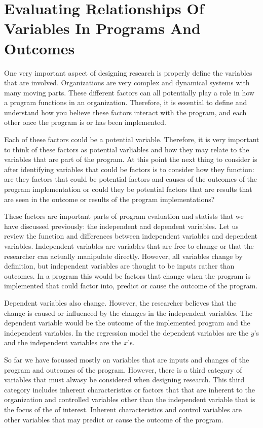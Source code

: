 \documentclass[]{book}
\theoremstyle{definition}
\theoremstyle{definition}
\theoremstyle{definition}
\theoremstyle{remark}
\begin{document}
\hypertarget{evaluating-relationships-of-variables-in-programs-and-outcomes}{%
\section{Evaluating Relationships Of Variables In Programs And
Outcomes}\label{evaluating-relationships-of-variables-in-programs-and-outcomes}}

One very important aspect of designing research is properly define the
variables that are involved. Organizations are very complex and
dynamical systems with many moving parts. These different factors can
all potentially play a role in how a program functions in an
organization. Therefore, it is essential to define and understand how
you believe these factors interact with the program, and each other once
the program is or has been implemented.

Each of these factors could be a potential variable. Therefore, it is
very important to think of these factors as potential varliables and how
they may relate to the variables that are part of the program. At this
point the next thing to consider is after identifying variables that
could be factors is to consider how they function: are they factors that
could be potential factors and causes of the outcomes of the program
implementation or could they be potential factors that are results that
are seen in the outcome or results of the program implementations?

These factors are important parts of program evaluation and statists
that we have discussed previously: the independent and dependent
variables. Let us review the function and differences between
independent variables and dependent variables. Independent variables are
variables that are free to change or that the researcher can actually
manipulate directly. However, all variables change by definition, but
independent variables are thought to be inputs rather than outcomes. In
a program this would be factors that change when the program is
implemented that could factor into, predict or cause the outcome of the
program.

Dependent variables also change. However, the researcher believes that
the change is caused or influenced by the changes in the independent
variables. The dependent variable would be the outcome of the
implemented program and the independent variables. In the regression
model the dependent variables are the \(y\)'s and the independent
variables are the \(x\)'s.

So far we have focussed mostly on variables that are inputs and changes
of the program and outcomes of the program. However, there is a third
category of variables that must alwasy be considered when designing
research. This third category includes inherent characteristics or
factors that that are inherent to the organization and controlled
variables other than the independent variable that is the focus of the
of interest. Inherent characteristics and control variables are other
variables that may predict or cause the outcome of the program.
\end{document}
